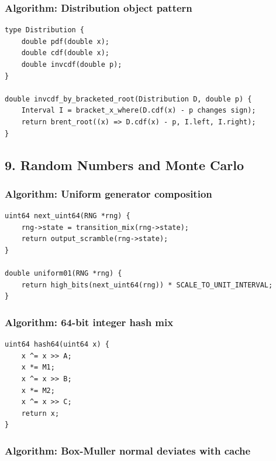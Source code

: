 \documentclass[11pt]{article}
\begin{document}
\subsubsection{Algorithm: Distribution object pattern}\label{algorithm-distribution-object-pattern}

\begin{verbatim}
type Distribution {
    double pdf(double x);
    double cdf(double x);
    double invcdf(double p);
}

double invcdf_by_bracketed_root(Distribution D, double p) {
    Interval I = bracket_x_where(D.cdf(x) - p changes sign);
    return brent_root((x) => D.cdf(x) - p, I.left, I.right);
}
\end{verbatim}

\subsection{9. Random Numbers and Monte Carlo}\label{random-numbers-and-monte-carlo}

\subsubsection{Algorithm: Uniform generator composition}\label{algorithm-uniform-generator-composition}

\begin{verbatim}
uint64 next_uint64(RNG *rng) {
    rng->state = transition_mix(rng->state);
    return output_scramble(rng->state);
}

double uniform01(RNG *rng) {
    return high_bits(next_uint64(rng)) * SCALE_TO_UNIT_INTERVAL;
}
\end{verbatim}

\subsubsection{Algorithm: 64-bit integer hash mix}\label{algorithm-64-bit-integer-hash-mix}

\begin{verbatim}
uint64 hash64(uint64 x) {
    x ^= x >> A;
    x *= M1;
    x ^= x >> B;
    x *= M2;
    x ^= x >> C;
    return x;
}
\end{verbatim}

\subsubsection{Algorithm: Box-Muller normal deviates with cache}\label{algorithm-box-muller-normal-deviates-with-cache}
\end{document}
